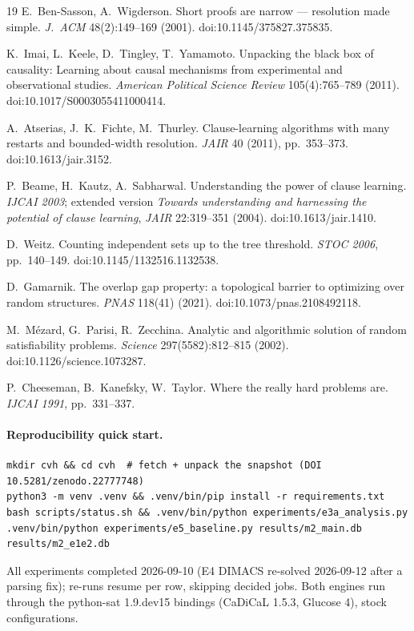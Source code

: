 \documentclass[11pt]{article}
\begin{document}
\begin{thebibliography}{19}
 E.~Ben-Sasson, A.~Wigderson. Short proofs are narrow ---
resolution made simple. \emph{J.~ACM} 48(2):149--169 (2001). doi:10.1145/375827.375835.

 K.~Imai, L.~Keele, D.~Tingley, T.~Yamamoto. Unpacking the
black box of causality: Learning about causal mechanisms from experimental
and observational studies. \emph{American Political Science Review}
105(4):765--789 (2011). doi:10.1017/S0003055411000414.

 A.~Atserias, J.~K.~Fichte, M.~Thurley. Clause-learning
algorithms with many restarts and bounded-width resolution. \emph{JAIR} 40
(2011), pp.~353--373. doi:10.1613/jair.3152.

 P.~Beame, H.~Kautz, A.~Sabharwal. Understanding
the power of clause learning. \emph{IJCAI 2003}; extended version
\emph{Towards understanding and harnessing the potential of clause
learning}, \emph{JAIR} 22:319--351 (2004). doi:10.1613/jair.1410.

 D.~Weitz. Counting independent sets up to the tree
threshold. \emph{STOC 2006}, pp.~140--149. doi:10.1145/1132516.1132538.

 D.~Gamarnik. The overlap gap property: a topological
barrier to optimizing over random structures. \emph{PNAS} 118(41) (2021).
doi:10.1073/pnas.2108492118.

 M.~M\'ezard, G.~Parisi, R.~Zecchina. Analytic and
algorithmic solution of random satisfiability problems. \emph{Science}
297(5582):812--815 (2002). doi:10.1126/science.1073287.

 P.~Cheeseman, B.~Kanefsky, W.~Taylor. Where the really
hard problems are. \emph{IJCAI 1991}, pp.~331--337.

\end{thebibliography}

{\small
\paragraph{Reproducibility quick start.}
\begin{verbatim}
mkdir cvh && cd cvh  # fetch + unpack the snapshot (DOI 10.5281/zenodo.22777748)
python3 -m venv .venv && .venv/bin/pip install -r requirements.txt
bash scripts/status.sh && .venv/bin/python experiments/e3a_analysis.py
.venv/bin/python experiments/e5_baseline.py results/m2_main.db results/m2_e1e2.db
\end{verbatim}
All experiments completed 2026-09-10 (E4 DIMACS re-solved 2026-09-12 after a
parsing fix); re-runs resume per row, skipping decided jobs. Both engines run
through the python-sat 1.9.dev15 bindings (CaDiCaL 1.5.3, Glucose 4), stock
configurations.}
\end{document}
